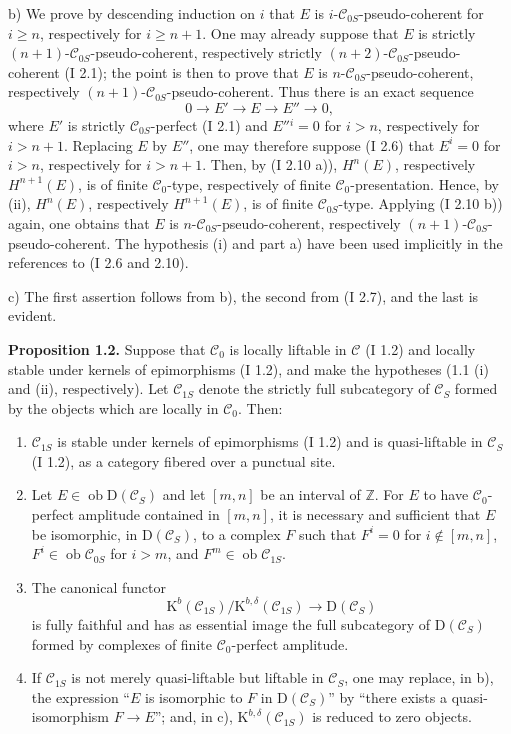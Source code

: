 \documentclass[11pt]{article}
\providecommand{\Ob}{\operatorname{ob}}
\begin{document}
b) We prove by descending induction on $i$ that $E$ is $i$-$\mathcal C_{0S}$-pseudo-coherent for $i\ge n$, respectively for $i\ge n+1$. One may already suppose that $E$ is strictly $(n+1)$-$\mathcal C_{0S}$-pseudo-coherent, respectively strictly $(n+2)$-$\mathcal C_{0S}$-pseudo-coherent (I 2.1); the point is then to prove that $E$ is $n$-$\mathcal C_{0S}$-pseudo-coherent, respectively $(n+1)$-$\mathcal C_{0S}$-pseudo-coherent. Thus there is an exact sequence
\[
0\longrightarrow E'\longrightarrow E\longrightarrow E''\longrightarrow0,
\]
where $E'$ is strictly $\mathcal C_{0S}$-perfect (I 2.1) and $E''{}^i=0$ for $i>n$, respectively for $i>n+1$. Replacing $E$ by $E''$, one may therefore suppose (I 2.6) that $E^i=0$ for $i>n$, respectively for $i>n+1$. Then, by (I 2.10 a)), $H^n(E)$, respectively $H^{n+1}(E)$, is of finite $\mathcal C_0$-type, respectively of finite $\mathcal C_0$-presentation. Hence, by (ii), $H^n(E)$, respectively $H^{n+1}(E)$, is of finite $\mathcal C_{0S}$-type. Applying (I 2.10 b)) again, one obtains that $E$ is $n$-$\mathcal C_{0S}$-pseudo-coherent, respectively $(n+1)$-$\mathcal C_{0S}$-pseudo-coherent. The hypothesis (i) and part a) have been used implicitly in the references to (I 2.6 and 2.10).

c) The first assertion follows from b), the second from (I 2.7), and the last is evident.

\textbf{Proposition 1.2.} Suppose that $\mathcal C_0$ is locally liftable in $\mathcal C$ (I 1.2) and locally stable under kernels of epimorphisms (I 1.2), and make the hypotheses (1.1 (i) and (ii), respectively). Let $\mathcal C_{1S}$ denote the strictly full subcategory of $\mathcal C_S$ formed by the objects which are locally in $\mathcal C_0$. Then:
\begin{enumerate}[label=\alph*)]
\item $\mathcal C_{1S}$ is stable under kernels of epimorphisms (I 1.2) and is quasi-liftable in $\mathcal C_S$ (I 1.2), as a category fibered over a punctual site.
\item Let $E\in\Ob\mathrm D(\mathcal C_S)$ and let $[m,n]$ be an interval of $\mathbb Z$. For $E$ to have $\mathcal C_0$-perfect amplitude contained in $[m,n]$, it is necessary and sufficient that $E$ be isomorphic, in $\mathrm D(\mathcal C_S)$, to a complex $F$ such that $F^i=0$ for $i\notin[m,n]$, $F^i\in\Ob\mathcal C_{0S}$ for $i>m$, and $F^m\in\Ob\mathcal C_{1S}$.
\item The canonical functor
\[
\mathrm K^b(\mathcal C_{1S})/\mathrm K^{b,\delta}(\mathcal C_{1S})
\longrightarrow \mathrm D(\mathcal C_S)
\]
is fully faithful and has as essential image the full subcategory of $\mathrm D(\mathcal C_S)$ formed by complexes of finite $\mathcal C_0$-perfect amplitude.
\item If $\mathcal C_{1S}$ is not merely quasi-liftable but liftable in $\mathcal C_S$, one may replace, in b), the expression ``$E$ is isomorphic to $F$ in $\mathrm D(\mathcal C_S)$'' by ``there exists a quasi-isomorphism $F\to E$''; and, in c), $\mathrm K^{b,\delta}(\mathcal C_{1S})$ is reduced to zero objects.
\end{enumerate}
\end{document}
